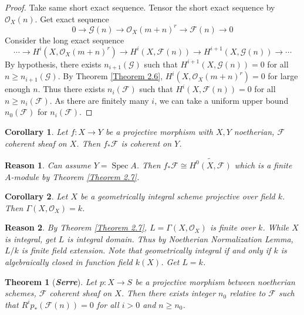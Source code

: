 \documentclass{ctexart}
\newtheorem{theorem}{Theorem}[section]
\newtheorem{reason}{Reason}[section]
\newtheorem{corollary}{Corollary}[section]
\newcommand{\spec}{\operatorname{Spec}}
\begin{document}
\begin{proof}
    Take same short exact sequence.
    Tensor the short exact sequence by $\mathcal{O}_{X}(n)$.
    Get exact sequence
    \begin{equation}
        0 \longrightarrow \mathcal{G}(n) \longrightarrow \mathcal{O}_{X}(m + n)^{r} \longrightarrow \mathcal{F}(n) \longrightarrow 0
    \end{equation}
    Consider the long exact sequence
    \begin{equation}
        \cdots \longrightarrow H^{i}(X, \mathcal{O}_{X}(m + n)^{r}) \longrightarrow H^{i}(X, \mathcal{F}(n)) \longrightarrow H^{i + 1}(X, \mathcal{G}(n)) \longrightarrow \cdots
    \end{equation}
    By hypothesis, there exists $n_{i + 1}(\mathcal{G})$ such that $H^{i + 1}(X, \mathcal{G}(n)) = 0$ for all $n \ge n_{i + 1}(\mathcal{G})$.
    By Theorem \ref{Theorem 2.6}, $H^{i}(X, \mathcal{O}_{X}(m + n)^{r}) = 0$ for large enough $n$.
    Thus there exists $n_{i}(\mathcal{F})$ such that $H^{i}(X, \mathcal{F}(n)) = 0$ for all $n \ge n_{i}(\mathcal{F})$.
    As there are finitely many $i$, we can take a uniform upper bound $n_{0}(\mathcal{F})$ for $n_{i}(\mathcal{F})$.
\end{proof}
\begin{corollary}
    Let $f: X \longrightarrow Y$ be a projective morphism with $X, Y$ noetherian, $\mathcal{F}$ coherent sheaf on $X$.
    Then $f_{\ast}\mathcal{F}$ is coherent on $Y$.
    \label{Corollary 2.8}
\end{corollary}
\begin{reason}
    Can assume $Y = \spec A$.
    Then $f_{\ast}\mathcal{F} \cong \widetilde{H^{0}(X, \mathcal{F})}$ which is a finite $A$-module by Theorem \ref{Theorem 2.7}.
\end{reason}
\begin{corollary}
    Let $X$ be a geometrically integral scheme projective over field $k$.
    Then $\Gamma(X, \mathcal{O}_{X}) = k$.
    \label{Corollary 2.9} 
\end{corollary}
\begin{reason}
    By Theorem \ref{Theorem 2.7}, $L = \Gamma(X, \mathcal{O}_{X})$ is finite over $k$.
    While $X$ is integral, get $L$ is integral domain.
    Thus by Noetherian Normalization Lemma, $L/k$ is finite field extension.
    Note that geometrically integral if and only if $k$ is algebraically closed in function field $k(X)$.
    Get $L = k$.
\end{reason}
\begin{theorem}[\textbf{\emph{Serre}}]
    Let $p: X \rightarrow S$ be a projective morphism between noetherian schemes, $\mathcal{F}$ coherent sheaf on $X$.
    Then there exists integer $n_{0}$ relative to $\mathcal{F}$ such that $R^{i}p_{\ast}(\mathcal{F}(n)) = 0$ for all $i > 0$ and $n \ge n_{0}$.
    \label{Theorem 2.8}
\end{theorem}
\end{document}
